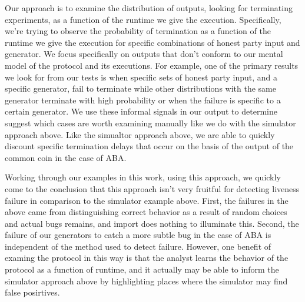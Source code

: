 Our approach is to examine the distribution of outputs, looking for terminating experiments, as a function of the runtime we give the execution.
Specifically, we're trying to observe the probability of termination as a function of the runtime we give the execution for specific combinations of honest party input and generator.
We focus specifically on outputs that don't conform to our mental model of the protocol and its executions.
For example, one of the primary results we look for from our tests is when specific sets of honest party input, and a specific generator, fail to terminate while other distributions with the same generator terminate with high probability or when the failure is specific to a certain generator.
We use these informal signals in our output to determine suggest which cases are worth examining manually like we do with the simulator approach above.
Like the simualtor approach above, we are able to quickly discount specific termination delays that occur on the basis of the output of the common coin in the case of ABA.

Working through our examples in this work, using this approach, we quickly come to the conclusion that this approach isn't very fruitful for detecting liveness failure in comparison to the simulator example above. 
First, the failures in the above came from distinguishing correct behavior as a result of random choices and actual bugs remains, and import does nothing to illuminate this.
Second, the failure of our generators to catch a more subtle bug in the case of ABA is independent of the method used to detect failure.
However, one benefit of examing the protocol in this way is that the analyst learns the behavior of the protocol as a function of runtime, and it actually may be able to inform the simulator approach above by highlighting places where the simulator may find false posirtives.


